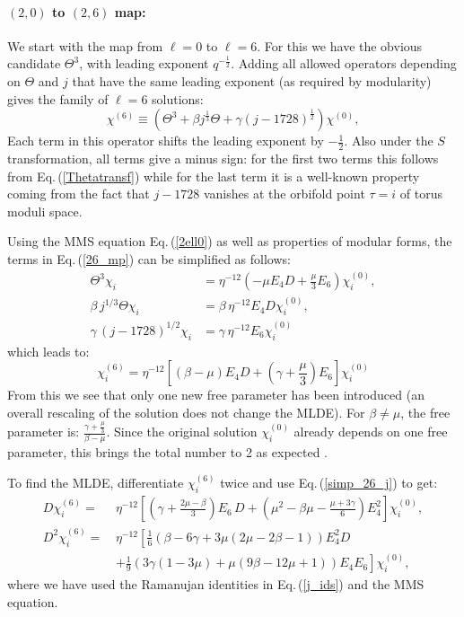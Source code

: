 \documentclass[11pt]{article}
\newcommand\half{\frac12}
\newcommand\be{\begin{equation}}
\newcommand\ee{\end{equation}}
\newcommand{\eref}[1]{Eq.\,(\ref{#1})}
\begin{document}
\paragraph{$(2,0)$ to $(2,6)$ map:} We start with the map from $\ell=0$ to $\ell=6$. For this we have the obvious candidate $\Theta^3$, with leading exponent $q^{-\half}$. Adding all allowed operators depending on $\Theta$ and $j$ that have the same leading exponent (as required by modularity) gives the family of $\ell=6$ solutions:
\be
\chi^{(6)}\equiv\left(\Theta^3+\beta j^{\frac13}\Theta+\gamma(j-1728)^\half\right)\chi^{(0)}, \label{26_mp}
\ee
Each term in this operator shifts the leading exponent by $-\half$. Also under the $S$ transformation, all terms give a minus sign: for the first two terms this follows from \eref{Thetatransf} while for the last term it is a well-known property coming from the fact that $j-1728$ vanishes at the orbifold point $\tau=i$ of torus moduli space. 

Using the MMS equation \eref{2ell0} as well as properties of modular forms, the terms in \eref{26_mp} can be simplified as follows:
\be\label{simp_26_j}
\begin{split}
\Theta^3\chi_i &= \eta^{-12}\left(-\mu E_4D+\frac{\mu}{3}E_6\right)\chi_i^{(0)}, \\[2mm]
\beta \, j^{1/3}\Theta \chi_i &= \beta \, \eta^{-12}E_4D\chi_i^{(0)},\\[2mm]
 \gamma \, (j-1728)^{1/2}\chi_i &= \gamma \, \eta^{-12}E_6\chi_i^{(0)}
\end{split}
\ee
which leads to:
\be
\chi^{(6)}_i = \eta^{-12}\left[(\beta-\mu)E_4D
+\left(\gamma+\frac{\mu}{3}\right)E_6\right]\chi_i^{(0)}
\ee
From this we see that only one new free parameter has been introduced (an overall rescaling of the solution does not change the MLDE). For $\beta\neq \mu$, the free parameter is: $\frac{\gamma+\frac{\mu}{3}}{\beta-\mu}$. Since the original solution $\chi_i^{(0)}$ already depends on one free parameter, this brings the total number to 2 as expected \cite{Chandra:2018pjq}.

To find the MLDE, differentiate $\chi^{(6)}_i$ twice and use  \eref{simp_26_j} to get:
\be
\begin{split}\label{Dpsi_6}
D\chi_i^{(6)} = \, &\eta^{-12}\left[\left(\gamma+\frac{2\mu-\beta}{3}\right)E_6\,D+\left(\mu^2-\beta\mu-\frac{\mu+3\gamma}{6}\right)E_4^2\right]\chi_i^{(0)}, \\
D^2\chi_i^{(6)} = \, & \eta^{-12}\left[\frac{1}{6}\left(\beta-6\gamma+3\mu\left(2\mu-2\beta-1\right)\right)E_4^2D\right.\\ 
&+\left.\frac{1}{9}\left(3\gamma\left(1-3\mu\right) 
+\mu\left(9\beta-12\mu+1\right)\right)E_4E_6\right]\chi_i^{(0)},
\end{split}
\ee
where we have used the Ramanujan identities in \eref{j_ids} 
and the MMS equation.
\end{document}
